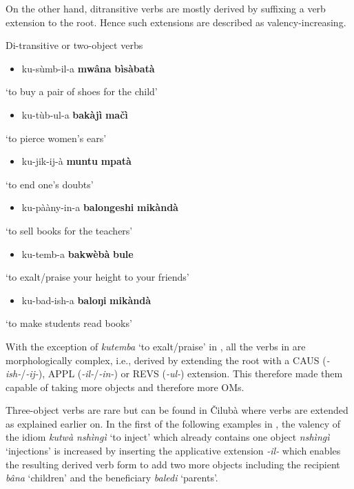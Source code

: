 \documentclass[output=paper]{langscibook}
\begin{document}
On the other hand, ditransitive verbs are mostly derived by suffixing a verb extension to the root. Hence such extensions are described as valency-increasing.

\ea%
    \label{ex:lukusa:28}
    \z

          Di-transitive or two-object verbs

\begin{itemize}
\item ku-sùmb-il-a \textbf{mwâna} \textbf{bìsàbatà}
\end{itemize}
\glt ‘to buy a pair of shoes for the child’

\begin{itemize}
\item ku-tùb-ul-a \textbf{bakàjì} \textbf{mačì}
\end{itemize}
\glt ‘to pierce women’s ears’

\begin{itemize}
\item ku-jik-ij-à \textbf{muntu} \textbf{mpatà}
\end{itemize}
\glt ‘to end one’s doubts’

\begin{itemize}
\item ku-pààny-in-a \textbf{balongeshi} \textbf{mikàndà}
\end{itemize}
\glt ‘to sell books for the teachers’

\begin{itemize}
\item ku-temb-a \textbf{bakwèbà} \textbf{bule}
\end{itemize}
\glt ‘to exalt/praise your height to your friends’

\begin{itemize}
\item ku-bad-ish-a \textbf{baloŋi} \textbf{mikàndà}
\end{itemize}
\glt ‘to make students read books’

With the exception of \textit{kutemba} ‘to exalt/praise’ in , all the verbs in  are morphologically complex, i.e., derived by extending the root with a CAUS (\textit{{}-ish-}/\textit{{}-ij-}), APPL (\textit{{}-il-}/\textit{{}-in-}) or REVS (\textit{{}-ul-}) extension. This therefore made them capable of taking more objects and therefore more OMs.

Three-object verbs are rare but can be found in Čilubà where verbs are extended as explained earlier on. In the first of the following examples in , the valency of the idiom \textit{kutwà nshìngì} ‘to inject’ which already contains one object \textit{nshìngì} ‘injections’ is increased by inserting the applicative extension \textit{{}-il-} which enables the resulting derived verb form to add two more objects including the recipient \textit{bâna} ‘children’ and the beneficiary \textit{baledi} ‘parents’.
\end{document}
